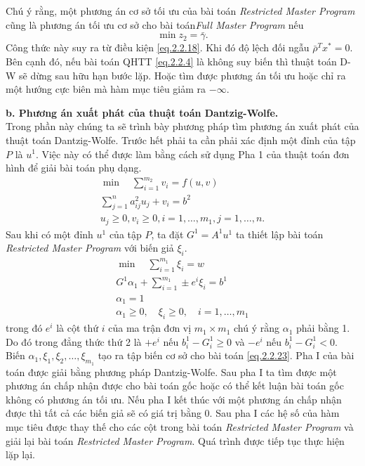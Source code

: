 Chú ý rằng, một phương án cơ sở tối ưu của bài toán {\it Restricted Master Program} cũng là phương án tối ưu cơ sở cho bài toán{\it Full Master Program} nếu 
\begin{equation}\label{eq.2.2.22}
\min z_2 = \bar\gamma.
\end{equation}
Công thức này suy ra từ điều kiện \eqref{eq.2.2.18}. Khi đó độ lệch đối ngẫu $\bar\rho^Tx^{*} = 0$.\\
Bên cạnh đó, nếu bài toán QHTT \eqref{eq.2.2.4} là không suy biến thì thuật toán D-W sẽ dừng sau hữu hạn bước lặp. Hoặc tìm được phương án tối ưu hoặc chỉ ra một hướng cực biên mà hàm mục tiêu giảm ra $-\infty$.

\textbf{b. Phương án xuất phát của thuật toán Dantzig-Wolfe. }\\
Trong phần này chúng ta sẽ trình bày phương pháp tìm phương án xuất phát của thuật toán Dantzig-Wolfe. Trước hết phải ta cần phải xác định một đỉnh của tập $P$ là $u^1$. Việc này có thể được làm bằng cách sử dụng Pha 1 của thuật toán đơn hình để giải bài toán phụ dạng.
\begin{equation}\label{eq.2.2.23}
\begin{array}{lll}
\min \quad \sum_{i=1}^{m_2}v_i = f(u, v)\\
\sum_{j=1}^na^2_{ij}u_j + v_i = b^2\\
u_j\geq 0, v_i\geq 0, i=1,\dots,m_1, j=1,\dots, n.
\end{array}
\end{equation}
Sau khi có một đỉnh $u^1$ của tập $P$, ta đặt $G^1=A^1u^1$ ta thiết lập bài toán {\it Restricted Master Program} với biến giả $\xi_i$.
\begin{equation}\label{PT030}
\begin{array}{lll}
\min \quad \sum_{i=1}^{m_1}\xi_i=w\\
G^1\alpha_1+\sum_{i=1}^{m_1}\pm e^i\xi_i=b^1\\
\alpha_1=1\\
\alpha_1\geq0,\quad \xi_i\geq0,\quad i=1,\dots,m_1
\end{array}
\end{equation}
trong đó $e^i$ là cột thứ $i$ của ma trận đơn vị $m_1\times m_1$ chú ý rằng $\alpha_1$ phải bằng 1. Do đó trong đẳng thức thứ 2 là $+e^i$ nếu $b^1_i-G^1_i\geq0$ và $-e^i$ nếu $b^1_i-G^1_i<0$. Biến $\alpha_1,\xi_1,\xi_2,\dots,\xi_{m_1}$ tạo ra tập biến cơ sở cho bài toán \eqref{eq.2.2.23}. Pha I của bài toán được giải bằng phương pháp Dantzig-Wolfe. Sau pha I ta tìm được một phương án chấp nhận được cho bài toán gốc hoặc có thể kết luận bài toán gốc không có phương án tối ưu. Nếu pha I kết thúc với một phương án chấp nhận được thì tất cả các biến giả sẽ có giá trị bằng $0$. Sau pha I các hệ số của hàm mục tiêu được thay thế cho các cột trong bài toán {\it Restricted Master Program} và giải lại bài toán {\it Restricted Master Program}. Quá trình được tiếp tục thực hiện lặp lại.


